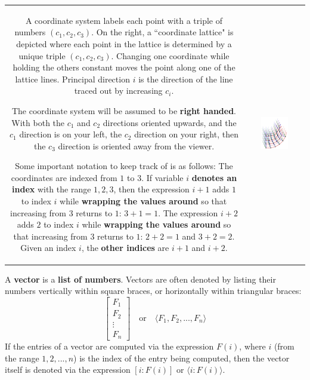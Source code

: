 \documentclass{book}
\begin{document}
\begin{tabular}{cc}
\parbox{0.5\textwidth}{
A coordinate system labels each point with a triple of numbers \((c_1, c_2, c_3)\). On the right, a ``coordinate lattice" is depicted where each point in the lattice is determined by a unique triple \((c_1, c_2, c_3)\). Changing one coordinate while holding the others constant moves the point along one of the lattice lines. Principal direction \(i\) is the direction of the line traced out by increasing \(c_i\).

The coordinate system will be assumed to be {\bf right handed}. With both the \(c_1\) and \(c_2\) directions oriented upwards, and the \(c_1\) direction is on your left, the \(c_2\) direction on your right, then the \(c_3\) direction is oriented away from the viewer.

Some important notation to keep track of is as follows: The coordinates are indexed from \(1\) to \(3\). If variable \(i\) {\bf denotes an index} with the range \(1, 2, 3\), then the expression \(i + 1\) adds \(1\) to index \(i\) while {\bf wrapping the values around} so that increasing from \(3\) returns to \(1\): \(3 + 1 = 1\). The expression \(i + 2\) adds \(2\) to index \(i\) while {\bf wrapping the values around} so that increasing from \(3\) returns to \(1\): \(2 + 2 = 1\) and \(3 + 2 = 2\). Given an index \(i\), the {\bf other indices} are \(i+1\) and \(i+2\).
} & \parbox{0.5\textwidth}{
\includegraphics[width = 0.5\textwidth]{Coordinate_systems/coordinate_system_lattice}
}
\end{tabular}

\vspace{1mm}

A \textbf{vector} is a {\bf list of numbers}. Vectors are often denoted by listing their numbers vertically within square braces, or horizontally within triangular braces: 
\[\begin{bmatrix} F_1 \\ F_2 \\ \vdots \\ F_n \end{bmatrix} \quad\text{or}\quad \langle F_1, F_2, ..., F_n \rangle\]
If the entries of a vector are computed via the expression \(F(i)\), where \(i\) (from the range \(1, 2, ..., n\)) is the index of the entry being computed, then the vector itself is denoted via the expression \([i : F(i)]\) or \(\langle i : F(i) \rangle\).
\end{document}
